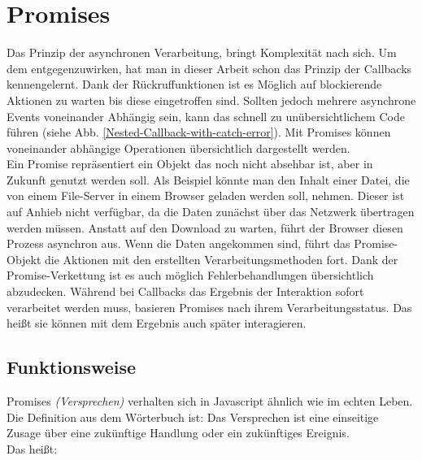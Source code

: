 \section{Promises}

Das Prinzip der asynchronen Verarbeitung, bringt Komplexität nach sich. Um dem entgegenzuwirken, hat man in dieser Arbeit schon das Prinzip der Callbacks kennengelernt. Dank der Rückruffunktionen ist es Möglich auf blockierende Aktionen zu warten bis diese eingetroffen sind. Sollten jedoch mehrere asynchrone Events voneinander Abhängig sein, kann das schnell zu unübersichtlichem Code führen (siehe Abb. \ref{Nested-Callback-with-catch-error}). Mit Promises können voneinander abhängige Operationen übersichtlich dargestellt werden.\\

\noindent
Ein Promise repräsentiert ein Objekt das noch nicht absehbar ist, aber in Zukunft genutzt werden soll. Als Beispiel könnte man den Inhalt einer Datei, die von einem File-Server in einem Browser geladen werden soll, nehmen. Dieser ist auf Anhieb nicht verfügbar, da die Daten zunächst über das Netzwerk übertragen werden müssen. Anstatt auf den Download zu warten, führt der Browser diesen Prozess asynchron aus. Wenn die Daten angekommen sind, führt das Promise-Objekt die Aktionen mit den erstellten Verarbeitungsmethoden fort. Dank der Promise-Verkettung ist es auch möglich Fehlerbehandlungen übersichtlich abzudecken. Während bei Callbacks das Ergebnis der Interaktion sofort verarbeitet werden muss, basieren Promises nach ihrem Verarbeitungsstatus. Das heißt sie können mit dem Ergebnis auch \glqq{}später\grqq{} interagieren.

\subsection{Funktionsweise}

\noindent
Promises \textit{(Versprechen)} verhalten sich in Javascript ähnlich wie im echten Leben. Die Definition aus dem Wörterbuch ist: Das Versprechen ist eine einseitige Zusage über eine zukünftige Handlung oder ein zukünftiges Ereignis\cite{versprechen}.\\

\noindent
Das heißt:

